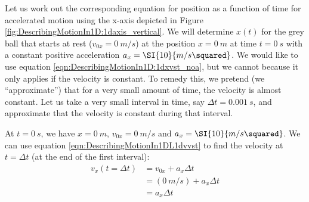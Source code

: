 
Let us work out the corresponding equation for position as a function of time for accelerated motion using the x-axis depicted in Figure \ref{fig:DescribingMotionIn1D:1daxis_vertical}. We will determine $x(t)$ for the grey ball that starts at rest ($v_{0x}=\SI{0}{m/s}$) at the position $x=\SI{0}{m}$ at time $t=\SI{0}{s}$ with a constant positive acceleration $a_x=\SI{10}{m/s\squared}$. We would like to use equation \ref{eqn:DescribingMotionIn1D:1dxvst_noa}, but we cannot because it only applies if the velocity is constant. To remedy this, we pretend (we ``approximate'') that for a very small amount of time, the velocity is almost constant. Let us take a very small interval in time, say $\Delta t=\SI{0.001}{s}$, and approximate that the velocity is constant during that interval. 

At $t=\SI{0}{s}$, we have $x=\SI{0}{m}$, $v_{0x}=\SI{0}{m/s}$ and $a_x=\SI{10}{m/s\squared}$. We can use equation \ref{eqn:DescribingMotionIn1DL1dvvst} to find the velocity at $t=\Delta t$ (at the end of the first interval):
\begin{align*}
v_x(t=\Delta t) &= v_{0x} + a_x\Delta t\\
&=(\SI{0}{m/s})+ a_x\Delta t\\&=a_x\Delta t
\end{align*}

